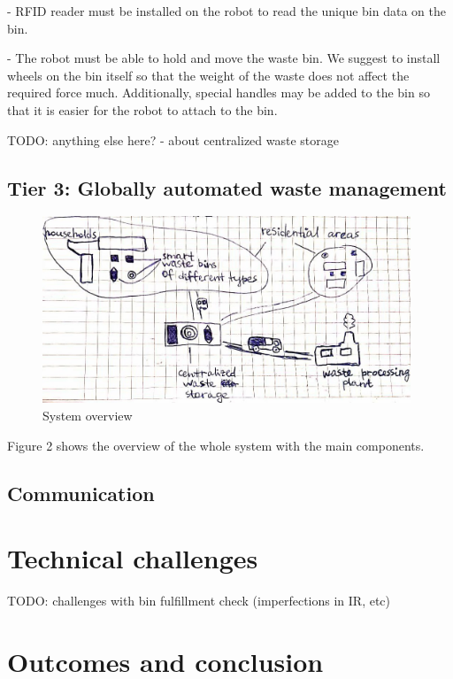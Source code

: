 \documentclass{article}
\begin{document}
- RFID reader must be installed on the robot to read the unique bin data on the bin.

- The robot must be able to hold and move the waste bin. We suggest to install wheels on the bin
itself so that the weight of the waste does not affect the required force much. Additionally,
special handles may be added to the bin so that it is easier for the robot to attach to the bin.

TODO: anything else here? - about centralized waste storage

\subsection{Tier 3: Globally automated waste management}

\begin{figure}[ht!]
\centering
\includegraphics[width=110mm]{./high_level_scheme.jpg}
\caption{System overview}
\end{figure}

Figure 2 shows the overview of the whole system with the main components.

\subsection{Communication}


\section{Technical challenges}
TODO: challenges with bin fulfillment check (imperfections in IR, etc)

\section{Outcomes and conclusion}
\end{document}
